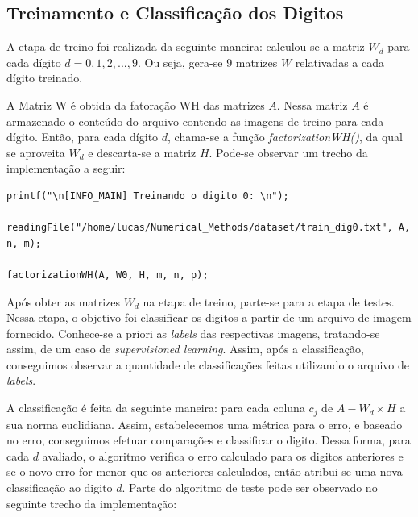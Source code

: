 \documentclass[twocolumn,amsmath,amssymb,floatfix]{revtex4}
\begin{document}
\subsection{Treinamento e Classificação dos Digitos}

A etapa de treino foi realizada da seguinte maneira: calculou-se a matriz $W_{d}$ para cada dígito $d = 0, 1, 2, ..., 9$. Ou seja, gera-se 9 matrizes $W$ relativadas a cada dígito treinado. 

A Matriz W é obtida da fatoração WH das matrizes $A$. Nessa matriz $A$ é armazenado o conteúdo do arquivo contendo as imagens de treino para cada dígito. Então, para cada dígito $d$, chama-se a função \textit{factorizationWH()}, da qual se aproveita $W_{d}$ e descarta-se a matriz $H$. Pode-se observar um trecho da implementação a seguir:

\begin{lstlisting}
printf("\n[INFO_MAIN] Treinando o digito 0: \n");

readingFile("/home/lucas/Numerical_Methods/dataset/train_dig0.txt", A, n, m);

factorizationWH(A, W0, H, m, n, p);

\end{lstlisting}

Após obter as matrizes $W_{d}$ na etapa de treino, parte-se para a etapa de testes. Nessa etapa, o objetivo foi classificar os digitos a partir de um arquivo de imagem fornecido. Conhece-se a priori as \textit{labels} das respectivas imagens, tratando-se assim, de um caso de \textit{supervisioned learning}. Assim, após a classificação, conseguimos observar a quantidade de classificações feitas utilizando o arquivo de \textit{labels}.

A classificação é feita da seguinte maneira: para cada coluna $c_{j}$ de $A - W_{d} \times H$ a sua norma euclidiana. Assim, estabelecemos uma métrica para o erro, e baseado no erro, conseguimos efetuar comparações e classificar o digito. Dessa forma, para cada $d$ avaliado, o algoritmo verifica o erro calculado para os digitos anteriores e se o novo erro for menor que os anteriores calculados, então atribui-se uma nova classificação ao digito $d$. Parte do algoritmo de teste pode ser observado no seguinte trecho da implementação:
\end{document}
